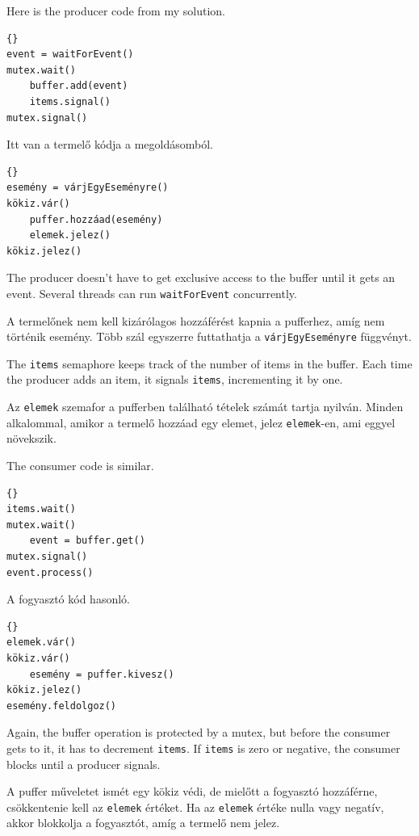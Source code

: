 \documentclass{book}
\begin{document}
Here is the producer code from my solution.

\begin{lstlisting}[title={Producer solution}]{}
event = waitForEvent()
mutex.wait()
    buffer.add(event)
    items.signal()
mutex.signal()
\end{lstlisting}

Itt van a termelő kódja a megoldásomból.

\begin{lstlisting}[title={Termelő megoldás}]{}
esemény = várjEgyEseményre()
kökiz.vár()
    puffer.hozzáad(esemény)
    elemek.jelez()
kökiz.jelez()
\end{lstlisting}

The producer doesn't have to get exclusive access to the buffer
until it gets an event.  Several threads can run {\tt waitForEvent}
concurrently.

A termelőnek nem kell kizárólagos hozzáférést kapnia a pufferhez,
amíg nem történik esemény. Több szál egyszerre futtathatja a {\tt várjEgyEseményre} függvényt.

The {\tt items} semaphore keeps track of the
number of items in the buffer.  Each time the producer adds an
item, it signals {\tt items}, incrementing it by one.

Az {\tt elemek} szemafor a pufferben található tételek számát tartja nyilván.
Minden alkalommal, amikor a termelő hozzáad egy elemet,
jelez {\tt elemek}-en, ami eggyel növekszik.

The consumer code is similar.

\begin{lstlisting}[title={Consumer solution}]{}
items.wait()
mutex.wait()
    event = buffer.get()
mutex.signal()
event.process()
\end{lstlisting}

A fogyasztó kód hasonló.

\begin{lstlisting}[title={Fogyasztó megoldás}]{}
elemek.vár()
kökiz.vár()
    esemény = puffer.kivesz()
kökiz.jelez()
esemény.feldolgoz()
\end{lstlisting}

Again, the buffer operation is protected by a mutex,
but before the consumer gets to it, it has to decrement
{\tt items}.  If {\tt items} is zero or negative, the
consumer blocks until a producer signals.

A puffer műveletet ismét egy kökiz védi,
de mielőtt a fogyasztó hozzáférne,
csökkentenie kell az {\tt elemek} értéket. Ha az {\tt elemek} értéke nulla vagy negatív,
akkor blokkolja a fogyasztót, amíg a termelő nem jelez.
\end{document}
